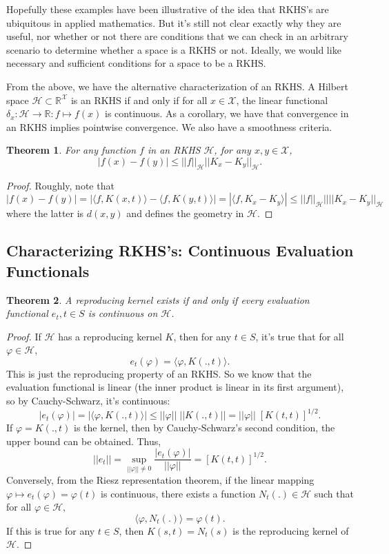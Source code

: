 \documentclass{article}
\newtheorem{thm}{Theorem}[section]
\theoremstyle{definition}
\theoremstyle{remark}
\numberwithin{equation}{section}
\begin{document}
Hopefully these examples have been illustrative of the idea that RKHS's are ubiquitous in applied mathematics. But it's still not clear exactly why they are useful, nor whether or not there are conditions that we can check in an arbitrary scenario to determine whether a space is a RKHS or not. Ideally, we would like necessary and sufficient conditions for a space to be a RKHS. 

From the above, we have the alternative characterization of an RKHS. A Hilbert space $\mathcal{H} \subset \mathbb{R}^{\mathcal{X}}$ is an RKHS if and only if for all $x \in \mathcal{X}$, the linear functional $\delta _x : \mathcal{H} \rightarrow \mathbb{R} : f \mapsto f(x)$ is continuous. As a corollary, we have that convergence in an RKHS implies pointwise convergence. We also have a smoothness criteria.

\begin{thm}
For any function $f$ in an RKHS $\mathcal{H}$, for any $x,y \in \mathcal{X}$, 
$$|f(x) - f(y)| \leq || f|| _{\mathcal{H}} || K_x - K_y||_{\mathcal{H}}. $$
\end{thm}

\begin{proof}
Roughly, note that 
$$|f(x) - f(y)| = |\langle f, K(x,t) \rangle - \langle f, K(y,t) \rangle | = | \langle f, K_x - K_y \rangle | \leq || f|| _{\mathcal{H}} || ||K_x - K_y|| _{\mathcal{H}}$$
where the latter is $d(x,y)$ and defines the geometry in $\mathcal{H}.$
\end{proof}

\subsection{Characterizing RKHS's: Continuous Evaluation Functionals}
\begin{thm} 
A reproducing kernel exists if and only if every evaluation functional $e_t, t \in S$ is continuous on $\mathcal{H}$.
\end{thm} 
\begin{proof}
If $\mathcal{H}$ has a reproducing kernel $K$, then for any $t \in S$, it's true that for all $\varphi \in \mathcal{H}$, 
$$e_t (\varphi ) = \langle \varphi , K(., t) \rangle . $$  This is just the reproducing property of an RKHS. So we know that the evaluation functional is linear (the inner product is linear in its first argument), so by Cauchy-Schwarz, it's continuous: 
$$|e_t (\varphi )| = | \langle \varphi , K(. , t) \rangle | \leq || \varphi || \; || K(., t)|| = || \varphi || \; [K(t,t)]^{1/2}.$$ 
If $\varphi = K(. , t)$ is the kernel, then by Cauchy-Schwarz's second condition, the upper bound can be obtained. Thus, 
$$|| e_t || = \sup _{||\varphi || \neq 0} \frac{|e_t (\varphi )|}{|| \varphi ||} = [K(t, t)]^{1/2}.$$
Conversely, from the Riesz representation theorem, if the linear mapping $\varphi \mapsto e_t (\varphi ) = \varphi (t)$ is continuous, there exists a function $N_t (.) \in \mathcal{H}$ such that for all $\varphi \in \mathcal{H},$
$$\langle \varphi, N_t (.) \rangle = \varphi (t).$$
If this is true for any $t \in S$, then $K(s, t) = N_t (s)$ is the reproducing kernel of $\mathcal{H}.$
\end{proof}
\end{document}
